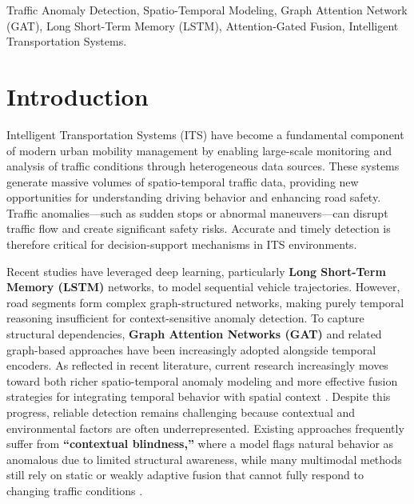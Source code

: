 \documentclass[journal]{IEEEtran}
\begin{document}
\begin{IEEEkeywords}
  Traffic Anomaly Detection, Spatio-Temporal Modeling, Graph Attention Network (GAT), Long Short-Term Memory (LSTM), Attention-Gated Fusion, Intelligent Transportation Systems.
\end{IEEEkeywords}

\section{Introduction}

Intelligent Transportation Systems (ITS) have become a fundamental component of modern urban mobility management by enabling large-scale monitoring and analysis of traffic conditions through heterogeneous data sources. These systems generate massive volumes of spatio-temporal traffic data, providing new opportunities for understanding driving behavior and enhancing road safety. Traffic anomalies—such as sudden stops or abnormal maneuvers—can disrupt traffic flow and create significant safety risks. Accurate and timely detection is therefore critical for decision-support mechanisms in ITS environments.

Recent studies have leveraged deep learning, particularly \textbf{Long Short-Term Memory (LSTM)} networks, to model sequential vehicle trajectories. However, road segments form complex graph-structured networks, making purely temporal reasoning insufficient for context-sensitive anomaly detection. To capture structural dependencies, \textbf{Graph Attention Networks (GAT)} and related graph-based approaches have been increasingly adopted alongside temporal encoders. As reflected in recent literature, current research increasingly moves toward both richer spatio-temporal anomaly modeling and more effective fusion strategies for integrating temporal behavior with spatial context \cite{huang_multivariate_2024, sun_framework_2025, nguyen_spatiotemporal_2026, liang_anomaly_2025}. Despite this progress, reliable detection remains challenging because contextual and environmental factors are often underrepresented. Existing approaches frequently suffer from \textbf{``contextual blindness,''} where a model flags natural behavior as anomalous due to limited structural awareness, while many multimodal methods still rely on static or weakly adaptive fusion that cannot fully respond to changing traffic conditions \cite{sun_framework_2025, liang_anomaly_2025}.
\end{document}
